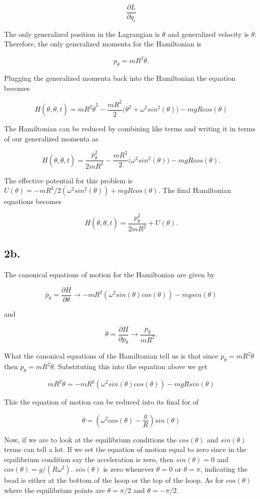\documentclass[12pt]{article}
\begin{document}
$$
\frac{\partial L}{\partial \dot{q_{i}}}
$$

The only generalized position in the Lagrangian is $\theta$ and generalized velocity is $\dot{\theta}$. Therefore, the only generalized momenta for the Hamiltonian is 

$$
p_{\theta} = mR^{2}\dot{\theta}.
$$

Plugging the generalized momenta back into the Hamiltonian the equation becomes 

$$
H(\theta, \dot{\theta}, t) = mR^{2}\dot{\theta}^2 - \frac{mR^{2}}{2}\Big(\dot{\theta^{2}} + \omega^{2}sin^{2}(\theta)\Big) - mgRcos(\theta)
$$

The Hamiltonian can be reduced by combining like terms and writing it in terms of our generalized momenta as 

$$
H(\theta, \dot{\theta}, t) = \frac{p_{\theta}^{2}}{2mR^{2}} - \frac{mR^{2}}{2}\Big(\omega^{2}sin^{2}(\theta)\Big) - mgRcos(\theta).
$$

The effective potential for this problem is $U(\theta) = -mR^{2}/2(\omega^{2}sin^{2}(\theta)) + mgRcos(\theta)$. The final Hamiltonian equations becomes

$$
H(\theta, \dot{\theta}, t) = \frac{p_{\theta}^{2}}{2mR^{2}} + U(\theta).
$$

\subsection*{2b.}

The canonical equations of motion for the Hamiltonian are given by

$$
\dot{p_{\theta}} = \frac{\partial H}{\partial \theta} \rightarrow -mR^{2}(\omega^{2}sin(\theta)cos(\theta)) - mgsin(\theta)
$$

and

$$
\dot{\theta} = \frac{\partial H}{\partial p_{\theta}} \rightarrow \frac{p_{\theta}}{mR^2}.
$$

What the canonical equations of the Hamiltonian tell us is that since $p_{\theta} = mR^{2}\dot{\theta}$ then $\ddot{p}_{\theta} = mR^{2}\ddot{\theta}$. Substituting this into the equation above we get 

$$
mR^{2}\ddot{\theta} = -mR^{2}(\omega^{2}sin(\theta)cos(\theta)) - mgRsin(\theta)
$$

This the equation of motion can be reduced into its final for of

$$
\ddot{\theta} = (\omega^{2}cos(\theta) - \frac{g}{R})sin(\theta)
$$

Now, if we are to look at the equilibrium conditions the $cos(\theta)$ and $sin(\theta)$ terms can tell a lot. If we set the equation of motion equal to zero since in the equilibrium condition say the acceleration is zero, then $sin(\theta) = 0$ and $cos(\theta) = g/(R\omega^{2})$. $sin(\theta)$ is zero whenever $\theta = 0$ or $\theta = \pi$, indicating the bead is either at the bottom of the hoop or the top of the hoop. As for $cos(\theta)$ where the equilibrium points are $\theta = \pi/2$ and $\theta = -\pi/2$.
\end{document}
